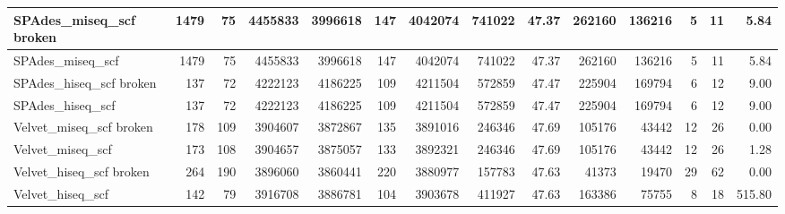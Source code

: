 \documentclass[12pt,a4paper]{article}
\begin{document}
\begin{table}[ht]
\begin{center}
\begin{tabular}{|l*{13}{|r}|}
SPAdes\_miseq\_scf broken & 1479 & 75 & 4455833 & 3996618 & 147 & 4042074 & 741022 & 47.37 & 262160 & 136216 & 5 & 11 & 5.84 \\ \hline
SPAdes\_miseq\_scf & 1479 & 75 & 4455833 & 3996618 & 147 & 4042074 & 741022 & 47.37 & 262160 & 136216 & 5 & 11 & 5.84 \\ \hline
SPAdes\_hiseq\_scf broken & 137 & 72 & 4222123 & 4186225 & 109 & 4211504 & 572859 & 47.47 & 225904 & 169794 & 6 & 12 & 9.00 \\ \hline
SPAdes\_hiseq\_scf & 137 & 72 & 4222123 & 4186225 & 109 & 4211504 & 572859 & 47.47 & 225904 & 169794 & 6 & 12 & 9.00 \\ \hline
Velvet\_miseq\_scf broken & 178 & 109 & 3904607 & 3872867 & 135 & 3891016 & 246346 & 47.69 & 105176 & 43442 & 12 & 26 & 0.00 \\ \hline
Velvet\_miseq\_scf & 173 & 108 & 3904657 & 3875057 & 133 & 3892321 & 246346 & 47.69 & 105176 & 43442 & 12 & 26 & 1.28 \\ \hline
Velvet\_hiseq\_scf broken & 264 & 190 & 3896060 & 3860441 & 220 & 3880977 & 157783 & 47.63 & 41373 & 19470 & 29 & 62 & 0.00 \\ \hline
Velvet\_hiseq\_scf & 142 & 79 & 3916708 & 3886781 & 104 & 3903678 & 411927 & 47.63 & 163386 & 75755 & 8 & 18 & 515.80 \\ \hline
\end{tabular}
\end{center}
\end{table}
\end{document}
